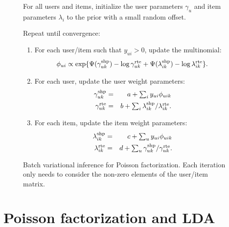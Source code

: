 \documentclass{sig-alternate}
\begin{document}
\begin{figure}
  \begin{framed}
    For all users and items, initialize the user parameters
    $\gamma_u$ and item parameters $\lambda_i$ to the prior with a
    small random offset.

    \vspace{0.1in}

    Repeat until convergence:
    \begin{enumerate}
    \item For each user/item such that $y_{ui} > 0$, update the multinomial:
      \begin{equation*}
        \phi_{ui} \propto \exp\{\Psi(\gamma_{uk}^{\textrm{shp}}) - \log
        \gamma_{uk}^{\textrm{rte}} + \Psi(\lambda_{ik}^{\textrm{shp}}) - \log
        \lambda_{ik}^{\textrm{rte}}\}.
      \end{equation*}
    \item For each user, update the user weight parameters:
      \begin{eqnarray*}
        \gamma_{uk}^{\textrm{shp}} &=& a + \textstyle \sum_{i} y_{ui}
        \phi_{uik} \\
        \gamma_{uk}^{\textrm{rte}} &=&  b + \textstyle \sum_i \lambda_{ik}^{\textrm{shp}} /
        \lambda_{ik}^{\textrm{rte}}.
      \end{eqnarray*}
    \item For each item, update the item weight parameters:
      \begin{eqnarray*}
        \lambda_{ik}^{\textrm{shp}} &=& c + \textstyle \sum_{u} y_{ui}
        \phi_{uik} \\
        \lambda_{ik}^{\textrm{rte}} &=& d + \textstyle \sum_u
        \gamma_{uk}^{\textrm{shp}} / \gamma_{uk}^{\textrm{rte}}.
      \end{eqnarray*}
    \end{enumerate}
\end{framed}
\caption{\label{fig:batch}Batch variational inference for Poisson
  factorization.  Each iteration only needs to consider the non-zero
  elements of the user/item matrix.}
\end{figure}








\appendix

\section{Poisson factorization and LDA}
\end{document}

